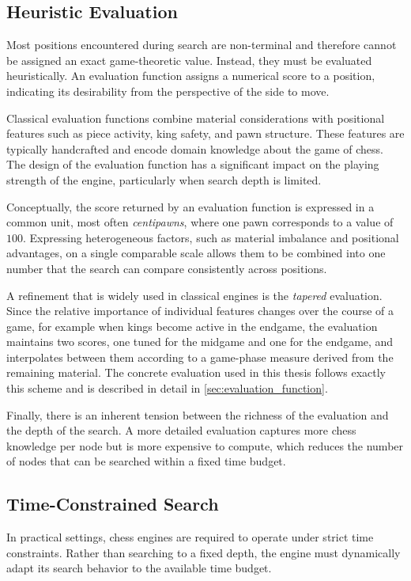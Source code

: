 \subsection{Heuristic Evaluation}

Most positions encountered during search are non-terminal and therefore cannot be
assigned an exact game-theoretic value. Instead, they must be evaluated
heuristically. An evaluation function assigns a numerical score to a position,
indicating its desirability from the perspective of the side to move.

Classical evaluation functions combine material considerations with positional
features such as piece activity, king safety, and pawn structure. These features
are typically handcrafted and encode domain knowledge about the game of chess.
The design of the evaluation function has a significant impact on the playing
strength of the engine, particularly when search depth is limited.

Conceptually, the score returned by an evaluation function is expressed in a
common unit, most often \emph{centipawns}, where one pawn corresponds to a value
of $100$. Expressing heterogeneous factors, such as material imbalance and
positional advantages, on a single comparable scale allows them to be combined
into one number that the search can compare consistently across positions.

A refinement that is widely used in classical engines is the \emph{tapered}
evaluation. Since the relative importance of individual features changes over the
course of a game, for example when kings become active in the endgame, the
evaluation maintains two scores, one tuned for the midgame and one for the
endgame, and interpolates between them according to a game-phase measure derived
from the remaining material. The concrete evaluation used in this thesis follows
exactly this scheme and is described in detail in \cref{sec:evaluation_function}.

Finally, there is an inherent tension between the richness of the evaluation and
the depth of the search. A more detailed evaluation captures more chess knowledge
per node but is more expensive to compute, which reduces the number of nodes that
can be searched within a fixed time budget.

\subsection{Time-Constrained Search}

In practical settings, chess engines are required to operate under strict time
constraints. Rather than searching to a fixed depth, the engine must dynamically
adapt its search behavior to the available time budget.

